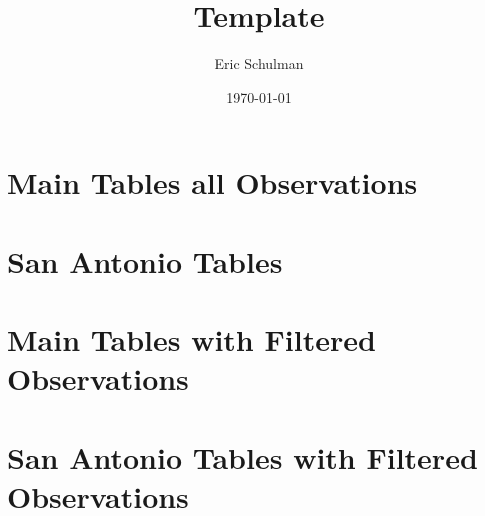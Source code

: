 \documentclass{article}
\title{Template}
\author{Eric Schulman}
\date{\today}
\begin{document}
\section{Main Tables all Observations}







\pagebreak

\section{San Antonio Tables}









\pagebreak

\section{Main Tables with Filtered Observations}








\pagebreak

\section{San Antonio Tables with Filtered Observations}








\end{document}
